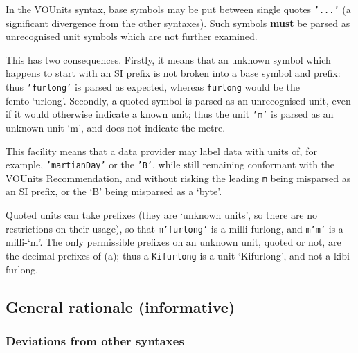 \documentclass[11pt,a4paper]{ivoa}
\newcommand{\unit}[1]{\texttt{\small\color{orange}#1}}
\newcommand*\norm[1]{\textbf{\color{ivoacolor}#1}}
\begin{document}
In the VOUnits syntax, base symbols may be put between single
quotes \unit{'...'} (a significant divergence from the other
syntaxes).  Such symbols \norm{must} be parsed as
unrecognised unit symbols which are not further examined.

This has two consequences.  Firstly, it means that an unknown symbol
which happens to start with an SI prefix is not broken
into a base symbol and prefix: thus \unit{'furlong'} is parsed as
expected, whereas \unit{furlong} would be the femto-`urlong'.
Secondly, a quoted symbol is parsed as an unrecognised unit, even if
it would otherwise indicate a known unit; thus the unit \unit{'m'} is
parsed as an unknown unit `m', and does not indicate the metre.

This facility means that a data provider may label data with units of,
for example, \unit{'martianDay'} or the \unit{'B'}, while still
remaining conformant with the VOUnits Recommendation, and without
risking the leading \texttt{m} being misparsed as an SI prefix, or the
`B' being misparsed as a `byte'.

Quoted units can take prefixes (they are `unknown units', so there are
no restrictions on their usage), so that \unit{m'furlong'} is a
milli-furlong, and \unit{m'm'} is a milli-`m'.  The only permissible
prefixes on an unknown unit, quoted or not, are the decimal prefixes of
(a); thus a \unit{Kifurlong} is a
unit ‘Kifurlong’, and not a kibi-furlong.

\subsection{General rationale (informative)}
\label{sec:rationale}

\subsubsection{Deviations from other syntaxes}
\label{sec:deviations}
\end{document}
